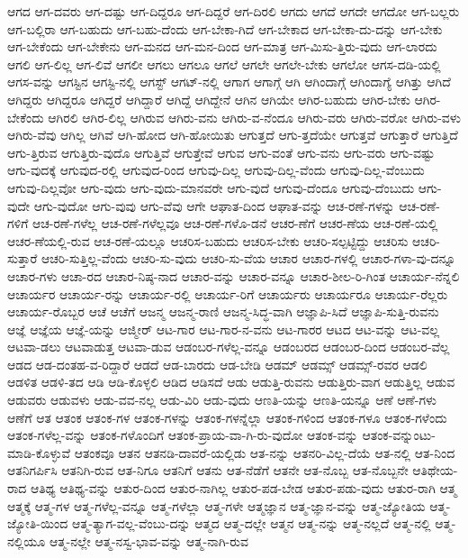 {ಆಗದ
ಆಗ-ದವರು
ಆಗ-ದಷ್ಟು
ಆಗ-ದಿದ್ದರೂ
ಆಗ-ದಿದ್ದರೆ
ಆಗ-ದಿರಲಿ
ಆಗದು
ಆಗದೆ
ಆಗದೇ
ಆಗದೋ
ಆಗ-ಬಲ್ಲರು
ಆಗ-ಬಲ್ಲಿರಾ
ಆಗ-ಬಹುದು
ಆಗ-ಬಹು-ದೆಂದು
ಆಗ-ಬೇಕಾ-ಗಿದೆ
ಆಗ-ಬೇಕಾದ
ಆಗ-ಬೇಕಾ-ದು-ದನ್ನು
ಆಗ-ಬೇಕು
ಆಗ-ಬೇಕೆಂದು
ಆಗ-ಬೇಕೇನು
ಆಗ-ಮನದ
ಆಗ-ಮನ-ದಿಂದ
ಆಗ-ಮಾತ್ರ
ಆಗ-ಮಿಸು-ತ್ತಿರು-ವುದು
ಆಗ-ಲಾರದು
ಆಗಲಿ
ಆಗ-ಲಿಲ್ಲ
ಆಗ-ಲಿವೆ
ಆಗಲೀ
ಆಗಲು
ಆಗಲೂ
ಆಗಲೆ
ಆಗಲೇ
ಆಗಲೇ-ಬೇಕು
ಆಗಲೋ
ಆಗಸ-ದಡಿ-ಯಲ್ಲಿ
ಆಗಸ-ವನ್ನು
ಆಗಸ್ಟಿನ
ಆಗಸ್ಟಿ-ನಲ್ಲಿ
ಆಗಸ್ಟ್
ಆಗಟ್‌-ನಲ್ಲಿ
ಆಗಾಗ
ಆಗಾಗ್ಗೆ
ಆಗಿ
ಆಗಿಂದಾಗ್ಗೆ
ಆಗಿಂದಾಗ್ಯೆ
ಆಗಿತ್ತು
ಆಗಿದೆ
ಆಗಿದ್ದರು
ಆಗಿದ್ದರೂ
ಆಗಿದ್ದರೆ
ಆಗಿದ್ದಾರೆ
ಆಗಿದ್ದೆ
ಆಗಿದ್ದೇನೆ
ಆಗಿನ
ಆಗಿಯೇ
ಆಗಿರ-ಬಹುದು
ಆಗಿರ-ಬೇಕು
ಆಗಿರ-ಬೇಕೆಂದು
ಆಗಿರಲಿ
ಆಗಿರ-ಲಿಲ್ಲ
ಆಗಿರುವ
ಆಗಿರು-ವನು
ಆಗಿರು-ವ-ನೆಂದೂ
ಆಗಿರು-ವರು
ಆಗಿರು-ವರೋ
ಆಗಿರು-ವಳು
ಆಗಿರು-ವೆವು
ಆಗಿಲ್ಲ
ಆಗಿವೆ
ಆಗಿ-ಹೋದ
ಆಗಿ-ಹೋಯಿತು
ಆಗುತ್ತದೆ
ಆಗು-ತ್ತದೆಯೇ
ಆಗುತ್ತವೆ
ಆಗುತ್ತಾರೆ
ಆಗುತ್ತಿದೆ
ಆಗು-ತ್ತಿರುವ
ಆಗುತ್ತಿರು-ವುದೊ
ಆಗುತ್ತಿವೆ
ಆಗುತ್ತೇವೆ
ಆಗುವ
ಆಗು-ವಂತೆ
ಆಗು-ವನು
ಆಗು-ವರು
ಆಗು-ವಷ್ಟು
ಆಗು-ವುದಕ್ಕೆ
ಆಗುವುದ-ರಲ್ಲಿ
ಆಗುವುದ-ರಿಂದ
ಆಗುವು-ದಿಲ್ಲ
ಆಗುವು-ದಿಲ್ಲ-ವೆಂದು
ಆಗುವು-ದಿಲ್ಲ-ವೆಂಬುದು
ಆಗುವು-ದಿಲ್ಲವೋ
ಆಗು-ವುದು
ಆಗು-ವುದು-ಮಾನವರೇ
ಆಗು-ವುದೆ
ಆಗುವು-ದೆಂದೂ
ಆಗುವು-ದೆಂಬುದು
ಆಗು-ವುದೇ
ಆಗು-ವುದೋ
ಆಗು-ವುವು
ಆಗು-ವೆವು
ಆಗೇ
ಆಘಾತ-ದಿಂದ
ಆಘಾತ-ವನ್ನು
ಆಚ-ರಣೆ-ಗಳನ್ನು
ಆಚ-ರಣೆ-ಗಳಿಗೆ
ಆಚ-ರಣೆ-ಗಳೆಲ್ಲ
ಆಚ-ರಣೆ-ಗಳೆಲ್ಲವೂ
ಆಚ-ರಣೆ-ಗಳೊ-ಡನೆ
ಆಚರ-ಣೆಗೆ
ಆಚರ-ಣೆಯ
ಆಚ-ರಣೆ-ಯಲ್ಲಿ
ಆಚರ-ಣೆಯಲ್ಲಿ-ರುವ
ಆಚ-ರಣೆ-ಯಲ್ಲೂ
ಆಚರಿಸ-ಬಹುದು
ಆಚರಿಸ-ಬೇಕು
ಆಚರಿ-ಸಲ್ಪಟ್ಟಿದ್ದು
ಆಚರಿಸು
ಆಚರಿ-ಸುತ್ತಾರೆ
ಆಚರಿ-ಸುತ್ತಿಲ್ಲ-ವೆಂದು
ಆಚರಿ-ಸು-ವುದು
ಆಚರಿ-ಸು-ವೆಯ
ಆಚಾರ
ಆಚಾರ-ಗಳಲ್ಲಿ
ಆಚಾರ-ಗಳಾ-ವು-ದನ್ನೂ
ಆಚಾರ-ಗಳು
ಆಚಾ-ರದ
ಆಚಾರ-ನಿಷ್ಠ-ನಾದ
ಆಚಾರ-ವನ್ನು
ಆಚಾರ-ವನ್ನೂ
ಆಚಾರ-ಶೀಲ-ರಿ-ಗಿಂತ
ಆಚಾರ್ಯ-ನೆನ್ನಲಿ
ಆಚಾರ್ಯರ
ಆಚಾರ್ಯ-ರನ್ನು
ಆಚಾರ್ಯ-ರಲ್ಲಿ
ಆಚಾರ್ಯ-ರಿಗೆ
ಆಚಾರ್ಯರು
ಆಚಾರ್ಯರೂ
ಆಚಾರ್ಯ-ರೆಲ್ಲರು
ಆಚಾರ್ಯ-ರೊಬ್ಬರ
ಆಚೆ
ಆಚೆಗೆ
ಆಜನ್ಮ
ಆಜನ್ಮ-ರಾಣಿ
ಆಜನ್ಮ-ಸಿದ್ಧ-ವಾಗಿ
ಆಜ್ಞಾಪಿ-ಸಿದೆ
ಆಜ್ಞಾಪಿ-ಸುತ್ತಿ-ರುವನು
ಆಜ್ಞೆ
ಆಜ್ಞೆಯ
ಆಜ್ಞೆ-ಯನ್ನು
ಆಜ್ಮೀರ್
ಆಟ-ಗಾರ
ಆಟ-ಗಾರ-ನ-ವನು
ಆಟ-ಗಾರರ
ಆಟದ
ಆಟ-ವನ್ನು
ಆಟ-ವಲ್ಲ
ಆಟವಾ-ಡಲು
ಆಟವಾಡುತ್ತ
ಆಟವಾ-ಡುವ
ಆಡಂಬರ-ಗಳೆಲ್ಲ-ವನ್ನೂ
ಆಡಂಬರದ
ಆಡಂಬರ-ದಿಂದ
ಆಡಂಬರ-ವೆಲ್ಲ
ಆಡದ
ಆಡ-ದಂತಹ-ವ-ರಿದ್ದಾರೆ
ಆಡದೆ
ಆಡ-ಬಾರದು
ಆಡ-ಬೇಡಿ
ಆಡಮ್
ಆಡಮ್ಸ್
ಆಡಮ್ಸ್‌-ರವರ
ಆಡಲಿ
ಆಡಳಿತ
ಆಡಳಿ-ತದ
ಆಡಿ
ಆಡಿ-ಕೊಳ್ಳಲಿ
ಆಡಿದ
ಆಡಿಸದೆ
ಆಡು
ಆಡುತ್ತಿ-ರುವನು
ಆಡುತ್ತಿರು-ವಾಗ
ಆಡುತ್ತಿಲ್ಲ
ಆಡುವ
ಆಡುವರು
ಆಡುವಳು
ಆಡು-ವವ-ನಲ್ಲ
ಆಡು-ವಿರಿ
ಆಡು-ವುದು
ಆಣತಿ-ಯನ್ನು
ಆಣತಿ-ಯನ್ನೂ
ಆಣೆ
ಆಣೆ-ಗಳು
ಆಣೆಗೆ
ಆತ
ಆತಂಕ
ಆತಂಕ-ಗಳ
ಆತಂಕ-ಗಳನ್ನು
ಆತಂಕ-ಗಳನ್ನೆಲ್ಲಾ
ಆತಂಕ-ಗಳಿಂದ
ಆತಂಕ-ಗಳೂ
ಆತಂಕ-ಗಳೆಂದು
ಆತಂಕ-ಗಳೆಲ್ಲ-ವನ್ನು
ಆತಂಕ-ಗಳೊಂದಿಗೆ
ಆತಂಕ-ಪ್ರಾಯ-ವಾ-ಗಿ-ರು-ವುದೋ
ಆತಂಕ-ವನ್ನು
ಆತಂಕ-ವನ್ನುಂಟು-ಮಾಡಿ-ಕೊಳ್ಳುವೆ
ಆತಂಕವೂ
ಆತನ
ಆತನಡಿ-ದಾವರೆ-ಯಲ್ಲಿಡು
ಆತ-ನನ್ನು
ಆತನರಿ-ವಿಲ್ಲ-ದೆಯೆ
ಆತ-ನಲ್ಲಿ
ಆತ-ನಿಂದ
ಆತನಿಗರ್ಪಿಸಿ
ಆತನಿಗಿ-ರುವ
ಆತ-ನಿಗೂ
ಆತನಿಗೆ
ಆತನು
ಆತ-ನೆಡೆಗೆ
ಆತನೇ
ಆತ-ನೊಬ್ಬ
ಆತ-ನೊಬ್ಬನೇ
ಆತಿಥೇಯ-ರಾದ
ಆತಿಥ್ಯ
ಆತಿಥ್ಯ-ವನ್ನು
ಆತುರ-ದಿಂದ
ಆತುರ-ನಾಗಿಲ್ಲ
ಆತುರ-ಪಡ-ಬೇಡ
ಆತುರ-ಪಡು-ವುದು
ಆತುರ-ರಾಗಿ
ಆತ್ಮ
ಆತ್ಮಕ್ಕೆ
ಆತ್ಮ-ಗಳ
ಆತ್ಮ-ಗಳೆಲ್ಲ-ವನ್ನೂ
ಆತ್ಮ-ಗಳೆಲ್ಲಾ
ಆತ್ಮ-ಗಳೇ
ಆತ್ಮಜ್ಞಾನ
ಆತ್ಮ-ಜ್ಞಾನ-ವನ್ನು
ಆತ್ಮ-ಜ್ಯೋತಿಯ
ಆತ್ಮ-ಜ್ಯೋತಿ-ಯಿಂದ
ಆತ್ಮ-ತ್ಯಾಗ-ವಲ್ಲ-ವೆಂಬು-ದನ್ನು
ಆತ್ಮದ
ಆತ್ಮ-ದಲ್ಲೇ
ಆತ್ಮನ
ಆತ್ಮ-ನನ್ನು
ಆತ್ಮ-ನಲ್ಲದೆ
ಆತ್ಮ-ನಲ್ಲಿ
ಆತ್ಮ-ನಲ್ಲಿಯೂ
ಆತ್ಮ-ನಲ್ಲೇ
ಆತ್ಮ-ನಸ್ವ-ಭಾವ-ವನ್ನು
ಆತ್ಮ-ನಾಗಿ-ರುವ
}
